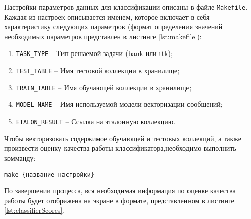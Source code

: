        Настройки параметров данных для классификации описаны в файле {\tt Makefile}.
        Каждая из настроек описывается именем, которое включает в себя
        характеристику следующих параметров (формат определения значений необходимых
        параметров представлен в листинге \ref{lst:makefile}):

        \begin{enumerate}
            \item {\tt TASK\_TYPE} -- Тип решаемой задачи ({bank} или {ttk});
            \item {\tt TEST\_TABLE} -- Имя тестовой коллекции в хранилище;
            \item {\tt TRAIN\_TABLE} -- Имя обучающей коллекции в хранилище;
            \item {\tt MODEL\_NAME} -- Имя используемой модели векторизации сообщений;
            \item {\tt ETALON\_RESULT} -- Ссылка на эталонную коллекцию.
        \end{enumerate}

        \lstset{style=bash}
        

        Чтобы векторизовать содержимое обучающей и тестовых коллекций, а также
        произвести оценку качества работы классификатора,необходимо выполнить
        комманду:
        \begin{center}
            {\tt make {\{название\_настройки\}}}
        \end{center}

        По завершении процесса, вся необходимая информация по оценке качества
        работы будет отображена на экране в формате, представленном в листинге
        \ref{lst:classifierScores}.


